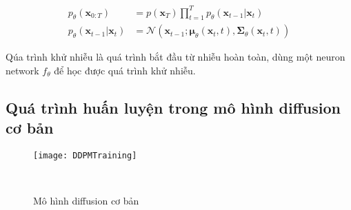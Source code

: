 
\begin{equation}
	\label{eq:denoising_process}
	\begin{aligned}
		p_\theta(\mathbf{x}_{0:T})
		&= p(\mathbf{x}_T) \prod^T_{t=1} p_\theta(\mathbf{x}_{t-1} \vert \mathbf{x}_t) \\
		p_\theta(\mathbf{x}_{t-1} \vert \mathbf{x}_t) &= \mathcal{N}(\mathbf{x}_{t-1};  \boldsymbol{\mu}_\theta(\mathbf{x}_t, t), \boldsymbol{\Sigma}_\theta(\mathbf{x}_t, t))
	\end{aligned}
\end{equation}

Qúa trình khử nhiễu là quá trình bắt đầu từ nhiễu hoàn toàn, dùng một neuron network $f_\theta$ để học được quá trình khử nhiễu.





\subsection{Quá trình huấn luyện trong mô hình diffusion cơ bản}
	
	\begin{figure}[H]
		\centering
		\texttt{[image: DDPMTraining]}
		\caption{Mô hình diffusion cơ bản}
		\label{fig:basic_diffusion}\
		\vspace{-5pt}
	\end{figure}
	
